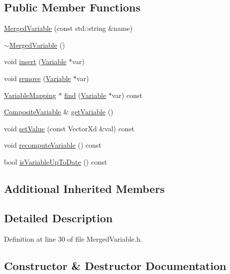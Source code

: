 \subsection*{Public Member Functions}
\begin{DoxyCompactItemize}
\item 
\hyperlink{classocra_1_1MergedVariable_ac6dcd7217ac6a6097ae95f5fe2afc513}{Merged\+Variable} (const std\+::string \&name)
\item 
\hyperlink{classocra_1_1MergedVariable_aa126050631c068dba3e1d12f31dea9ec}{$\sim$\+Merged\+Variable} ()
\item 
void \hyperlink{classocra_1_1MergedVariable_aa91f4ed9514c3dd4bf1ae4e25cf1e118}{insert} (\hyperlink{classocra_1_1Variable}{Variable} $\ast$var)
\item 
void \hyperlink{classocra_1_1MergedVariable_ae0a14af6f9fb0b0dc72d6023e7e40069}{remove} (\hyperlink{classocra_1_1Variable}{Variable} $\ast$var)
\item 
\hyperlink{classocra_1_1VariableMapping}{Variable\+Mapping} $\ast$ \hyperlink{classocra_1_1MergedVariable_a632fc3715c9def6d3dafac17be4c962d}{find} (\hyperlink{classocra_1_1Variable}{Variable} $\ast$var) const 
\item 
\hyperlink{classocra_1_1CompositeVariable}{Composite\+Variable} \& \hyperlink{classocra_1_1MergedVariable_afa4986407c3fbaebe268fd248b2c4bcf}{get\+Variable} ()
\item 
void \hyperlink{classocra_1_1MergedVariable_af144217ae6b5299a8b390b7a9d3e1f6f}{set\+Value} (const Vector\+Xd \&val) const 
\item 
void \hyperlink{classocra_1_1MergedVariable_a426f8f855177b127c03e589105ec984e}{recompute\+Variable} () const 
\item 
bool \hyperlink{classocra_1_1MergedVariable_aacd4a3af9836eca6de26ab61eb8c3255}{is\+Variable\+Up\+To\+Date} () const 
\end{DoxyCompactItemize}
\subsection*{Additional Inherited Members}


\subsection{Detailed Description}


Definition at line 30 of file Merged\+Variable.\+h.



\subsection{Constructor \& Destructor Documentation}

